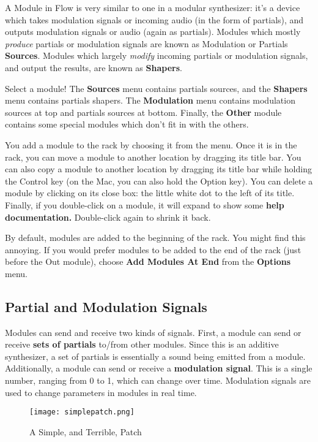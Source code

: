 \documentclass{article}
\begin{document}
A Module in Flow is very similar to one in a modular synthesizer: it's a device which takes modulation signals or incoming audio (in the form of partials), and outputs modulation signals or audio (again as partials).  Modules which mostly {\it produce} partials or modulation signals are known as Modulation or Partials {\bf Sources}.  Modules which largely {\it modify} incoming partials or modulation signals, and output the results, are known as {\bf Shapers}. 

Select a module!  The {\bf Sources} menu contains partials sources, and the {\bf Shapers} menu contains partials shapers.  The {\bf Modulation} menu contains modulation sources at top and partials sources at bottom.  Finally, the {\bf Other} module contains some special modules which don't fit in with the others.

You add a module to the rack by choosing it from the menu.  Once it is in the rack, you can move a module to another location by dragging its title bar.  You can also copy a module to another location by dragging its title bar while holding the Control key (on the Mac, you can also hold the Option key).  You can delete a module by clicking on its close box: the little white dot to the left of its title.  Finally, if you double-click on a module, it will expand to show some {\bf help documentation.}  Double-click again to shrink it back. 

By default, modules are added to the beginning of the rack.  You might find this annoying.  If you would prefer modules to be added to the end of the rack (just before the Out module), choose {\bf Add Modules At End} from the {\bf Options} menu.

\subsection{Partial and Modulation Signals}  Modules can send and receive two kinds of signals.  First, a module can send or receive {\bf sets of partials} to/from other modules.  Since this is an additive synthesizer, a set of partials is essentially a sound being emitted from a module.  Additionally, a module can send or receive a {\bf modulation signal}.  This is a single number, ranging from 0 to 1, which can change over time.  Modulation signals are used to change parameters in modules in real time.  

\begin{wrapfigure}{r}{2.6in}
\vspace{-1.5em}
\texttt{[image: simplepatch.png]}
\caption{A Simple, and Terrible, Patch}
\label{simplepatch}
\end{wrapfigure}
\end{document}

